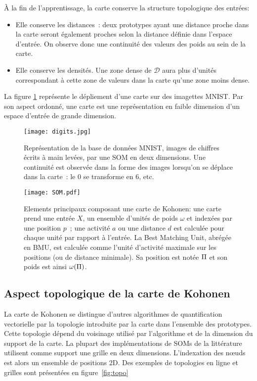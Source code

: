 \documentclass[../main]{subfiles}
\begin{document}
\`A la fin de l'apprentissage, la carte conserve la structure topologique des entrées:
\begin{itemize}
\item Elle conserve les distances~: deux prototypes ayant une distance proche dans la carte seront également proches selon la distance définie dans l'espace d'entrée. On observe donc une continuité des valeurs des poids au sein de la carte.
\item Elle conserve les densités. Une zone dense de $\mathcal{D}$ aura plus d'unités correspondant à cette zone de valeurs dans la carte qu'une zone moins dense.
\end{itemize}
La figure \ref{fig:digits} représente le dépliement d'une carte sur des imagettes MNIST.
Par son aspect ordonné, une carte est une représentation en faible dimension d'un espace d'entrée de grande dimension.

\begin{figure}
\centering
\texttt{[image: digits.jpg]}
\caption{Représentation de la base de données MNIST, images de chiffres écrits à main levées, par une SOM en deux dimensions. Une continuité est observée dans la forme des images lorsqu'on se déplace dans la carte~: le $0$ se transforme en $6$, etc.}
\label{fig:digits}
\end{figure}

\begin{figure}
    \centering
    \texttt{[image: SOM.pdf]}
    \caption{Elements principaux composant une carte de Kohonen: une carte prend une entrée $X$, un ensemble d'unités de poids $\omega$ et indexées par une position $p$~; une activité $a$ ou une distance $d$ est calculée pour chaque unité par rapport à l'entrée. La Best Matching Unit, abrégée en BMU, est calculée comme l'unité d'activité maximale sur les positions (ou de distance minimale). Sa position est notée $\Pi$ et son poids est ainsi $\omega(\Pi)$.  \label{fig:SOM}}
    \end{figure}
    

\subsection{Aspect topologique de la carte de Kohonen}

La carte de Kohonen se distingue d'autres algorithmes de quantification vectorielle par la topologie introduite par la carte dans l'ensemble des prototypes. Cette topologie dépend du voisinage utilisé par l'algorithme et de la dimension du support de la carte.
La plupart des implémentations de SOMs de la littérature utilisent comme support une grille en deux dimensions. L'indexation des n\oe{}uds est alors un ensemble de positions 2D. Des exemples de topologies en ligne et grilles sont présentées en figure~\ref{fig:topo}
\end{document}
